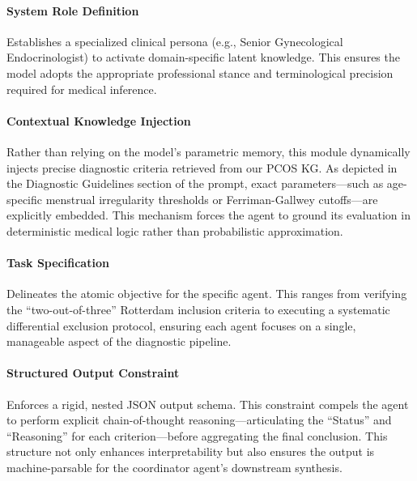 \documentclass[a4paper,fleqn]{cas-dc}
\begin{document}
    \paragraph{System Role Definition} Establishes a specialized clinical persona (e.g., Senior Gynecological Endocrinologist) to activate domain-specific latent knowledge. This ensures the model adopts the appropriate professional stance and terminological precision required for medical inference.
    \paragraph{Contextual Knowledge Injection} Rather than relying on the model's parametric memory, this module dynamically injects precise diagnostic criteria retrieved from our PCOS KG. As depicted in the Diagnostic Guidelines section of the prompt, exact parameters—such as age-specific menstrual irregularity thresholds or Ferriman-Gallwey cutoffs—are explicitly embedded. This mechanism forces the agent to ground its evaluation in deterministic medical logic rather than probabilistic approximation.
    \paragraph{Task Specification} Delineates the atomic objective for the specific agent. This ranges from verifying the ``two-out-of-three'' Rotterdam inclusion criteria to executing a systematic differential exclusion protocol, ensuring each agent focuses on a single, manageable aspect of the diagnostic pipeline.
    \paragraph{Structured Output Constraint} Enforces a rigid, nested JSON output schema. This constraint compels the agent to perform explicit chain-of-thought reasoning—articulating the ``Status'' and ``Reasoning'' for each criterion—before aggregating the final conclusion. This structure not only enhances interpretability but also ensures the output is machine-parsable for the coordinator agent's downstream synthesis.


\end{document}
